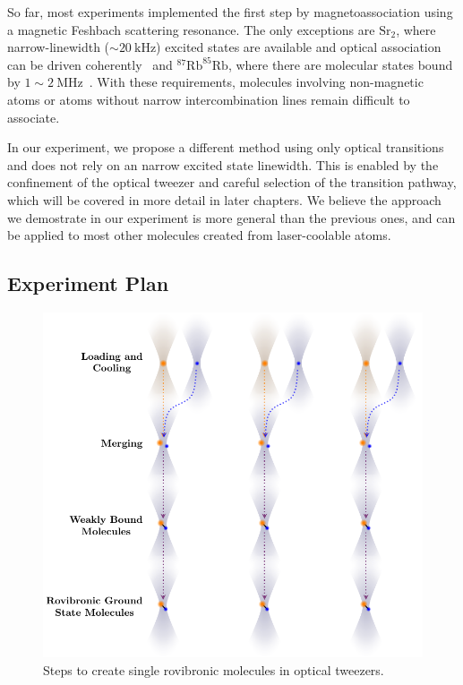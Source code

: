 So far, most experiments implemented the first step
by magnetoassociation using a magnetic Feshbach scattering resonance.
The only exceptions are $\mathrm{Sr}_2$,
where narrow-linewidth ($\sim 20~\mathrm{kHz}$) excited states
are available and optical association can be driven coherently~\cite{
  reinaudi_optical_2012,stellmer_creation_2012}
and $^{87}\mathrm{Rb}^{85}\mathrm{Rb}$,
where there are molecular states bound by $1\sim2~\mathrm{MHz}$~\cite{he_coherently_2020}.
With these requirements, molecules involving non-magnetic atoms
or atoms without narrow intercombination lines remain difficult to associate.

In our experiment, we propose a different method using only optical transitions
and does not rely on an narrow excited state linewidth.
This is enabled by the confinement of the optical tweezer and
careful selection of the transition pathway,
which will be covered in more detail in later chapters.
We believe the approach we demostrate in our experiment is more general
than the previous ones,
and can be applied to most other molecules created from laser-coolable atoms.

\subsection{Experiment Plan}
\label{ch:introduction:tweezers:plan}

\begin{figure}
  \centering
  \includegraphics[width=\textwidth]{figures/introduction_steps.pdf}
  \caption[Molecule creation steps.]{
    Steps to create single rovibronic molecules in optical tweezers.
    \label{fig:introduction:tweezers:plan:steps}}
\end{figure}


